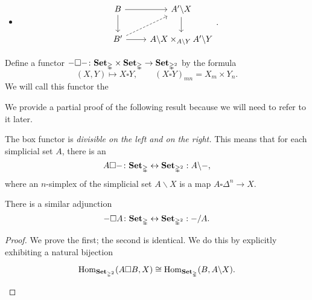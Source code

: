 \documentclass[main.tex]{subfiles}
\begin{document}
\begin{appendix}
\begin{itemize}
    \item
      \begin{equation*}
        \begin{tikzcd}
          B
          \arrow[r]
          \arrow[d]
          & A' \backslash X 
          \arrow[d]
          \\
          B'
          \arrow[r]
          \arrow[ur, dashed]
          & A \backslash X \times_{A \backslash Y} A' \backslash Y
        \end{tikzcd}.
      \end{equation*}
  \end{itemize}

  \begin{definition}
    Define a functor $- \square -\colon \mathbf{Set}_{\mathbb{\Delta}} \times \mathbf{Set}_{\mathbb{\Delta}} \to \mathbf{Set}_{\mathbb{\Delta}^{2}}$ by the formula
    \begin{equation*}
      (X, Y) \mapsto X \square Y,\qquad (X \square Y)_{mn} = X_{m} \times Y_{n}.
    \end{equation*}
    We will call this functor the 
  \end{definition}

  We provide a partial proof of the following result because we will need to refer to it later.
  \begin{proposition}
    \label{prop:bijection_exhibiting_box_divisibility}
    The box functor is \emph{divisible on the left and on the right.} This means that for each simplicial set $A$, there is an
    \begin{equation*}
      A \square -\colon \mathbf{Set}_{\mathbb{\Delta}} \leftrightarrow \mathbf{Set}_{\mathbb{\Delta}^{2}} : A \backslash -,
    \end{equation*}
    where an $n$-simplex of the simplicial set $A \backslash X$ is a map $A \square \Delta^{n} \to X$.

    There is a similar adjunction
    \begin{equation*}
      - \square A\colon \mathbf{Set}_{\mathbb{\Delta}} \leftrightarrow \mathbf{Set}_{\mathbb{\Delta}^{2}} : - / A.
    \end{equation*}
  \end{proposition}
  \begin{proof}
    We prove the first; the second is identical. We do this by explicitly exhibiting a natural bijection
    \begin{equation*}
      \begin{tikzcd}
        \Hom_{\SSSet}(A \square B, X) \cong \Hom_{\SSet}(B, A \backslash X).
      \end{tikzcd}
    \end{equation*}


\end{proof}
\end{appendix}
\end{document}
